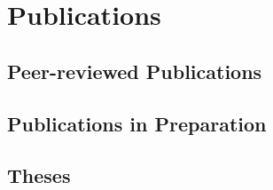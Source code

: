 \ifacademic
  \section{Publications}
  
  \subsection{Peer-reviewed Publications}
    \begin{refsection}
      \vspace{2mm}
      \onehalfspacing
      \nocite{
        DiBaldassarre2018,
        Breinl2017,
        GironsLopez2017,
        GironsLopez2016a,
        Mbanguka2016,
        GironsLopez2015
      }
      \printbibliography[heading=none]
    \end{refsection}

    
  \subsection{Publications in Preparation}
    \begin{refsection}
      \vspace{2mm}
      \onehalfspacing
      \nocite{
        GironsLopez2018b,
        GironsLopez2018c,
        Rivera2018,
        Rivera2018a
      }
      \printbibliography[heading=none]
      \end{refsection}
  
  \subsection{Theses}
    \begin{refsection}
      \vspace{2mm}
      \onehalfspacing
      \nocite{
        GironsLopez2016,
        GironsLopez2011
      }
      \printbibliography[heading=none]
      \end{refsection}
  
  \newpage

